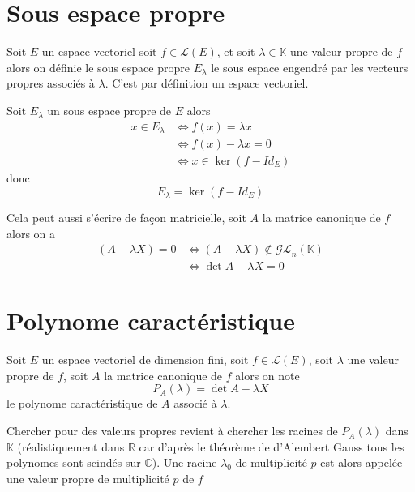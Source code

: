\documentclass[11pt,colorlinks]{book}
\theoremstyle{mytheoremstyle}
\theoremstyle{mytheoremstyle}
\theoremstyle{mytheoremstyle}
\theoremstyle{mytheoremstyle}
\theoremstyle{mytheoremstyle}
\theoremstyle{mytheoremstyle}
\theoremstyle{mytheoremstyle}
\theoremstyle{mytheoremstyle}
\theoremstyle{myproblemstyle}
\def\mbb#1{\mathbb{#1}}
\def\mfc#1{\mathcal{#1}}
\def\bC{\mbb{C}}
\def\bR{\mbb{R}}
\def\bK{\mbb{K}}
\def\ev{espace vectoriel }
\begin{document}
\section{Sous espace propre}
\begin{definition}
  Soit $E$ un espace vectoriel soit $f \in \mfc{L}(E)$, et soit $\lambda \in \bK$ une valeur propre de $f$ alors on définie le sous espace propre
  $E_\lambda$ le sous espace engendré par les vecteurs propres associés à $\lambda$. C'est par définition un espace vectoriel.
\end{definition}
\begin{prop}[Caractérisation]
  Soit $E_{\lambda}$ un sous espace propre de $E$ alors 
  \begin{align*}
    x \in E_{\lambda} &\Leftrightarrow f(x) = \lambda x \\ 
    &\Leftrightarrow f(x) - \lambda x = 0 \\ 
    &\Leftrightarrow x \in \ker (f - Id_E)
  \end{align*}
  donc 
  \begin{equation*}
    E_\lambda = \ker (f - Id_E)
  \end{equation*}
\end{prop}
\begin{rmq}
  Cela peut aussi s'écrire de façon matricielle, soit $A$ la matrice canonique de $f$ alors on a 
  \begin{align*}
    (A-\lambda X) = 0 &\Leftrightarrow (A-\lambda X) \not\in \mfc{GL}_n(\bK) \\
    &\Leftrightarrow \det A-\lambda X = 0
  \end{align*}
\end{rmq}
\section{Polynome caractéristique}
\begin{definition}
  Soit $E$ un \ev de dimension fini, soit $f \in \mfc{L}(E)$, soit $\lambda$ une valeur propre de $f$, soit $A$ la matrice canonique de $f$
  alors on note 
  \begin{equation*}
    P_A(\lambda) = \det A - \lambda X
  \end{equation*}
  le polynome caractéristique de $A$ associé à $\lambda$.

  
  Chercher pour des valeurs propres revient à chercher les racines de $P_A(\lambda)$ dans $\bK$ (réalistiquement dans $\bR$ car d'après le théorème de 
  d'Alembert Gauss tous les polynomes sont scindés sur $\bC$). Une racine $\lambda_0$ de multiplicité $p$ est alors appelée une valeur propre de multiplicité $p$ de $f$
\end{definition}
\end{document}
